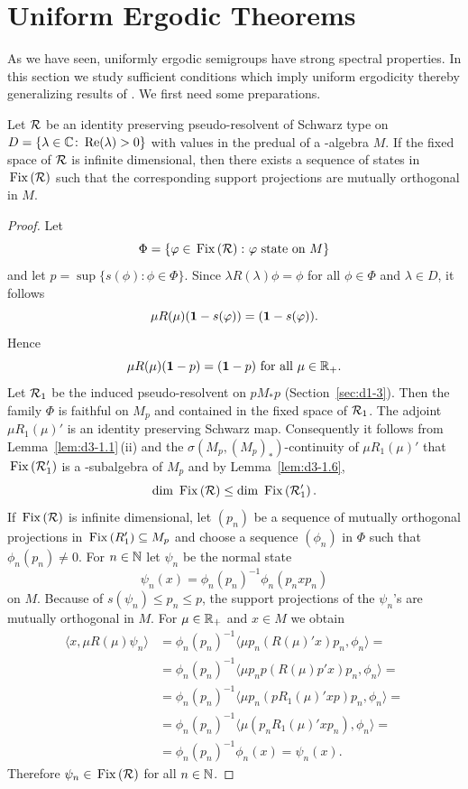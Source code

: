 \section{Uniform Ergodic Theorems}\label{sec:d4-4}
As we have seen, uniformly ergodic semigroups have strong spectral properties.
In this section we study sufficient conditions which imply uniform ergodicity thereby generalizing results of 
\textcite{groh:1984b}.
We first need some preparations.
\begin{lemma}\label{lem:d4-4.1}
Let $ \mathcal{R} $  be an identity preserving pseudo-resolvent of Schwarz type on $ D = \{\lambda \in \mathbb{C} \colon  \mathop{}\!\mathrm{Re}(\lambda) > 0\} $  with values in the predual of a \WA-algebra $ M $.
If the fixed space of\/ $ \mathcal{R} $  is infinite dimensional, then there exists a sequence of states in $ \mathop{}\mathrm{Fix}\left(\mathcal{R}\right) $  such that the corresponding support projections are mutually orthogonal in $ M $.
\end{lemma}
\begin{proof}
Let 
%
\[
	\Phi = \{\phi \in \Fix{\RR} \colon \phi \text{ state on $ M $}\}  
\]
%
and let 
$ p = \sup\{s(\phi) \colon \phi \in \Phi\} $.
Since 
$ \lambda R(\lambda)\phi = \phi $  
for all $ \phi \in \Phi $  and $ \lambda \in D $,  it follows 
%
\[
	\mu R(\mu)(\1 - s(\phi)) = (\1 - s(\phi)) .
\]
%
Hence 
%
\[
	\mu R(\mu)(\mathbf{1} - p) = (\mathbf{1} -p )    \text{ for all } \mu \in \mathbb{R}_{+} .
\]
%
Let $ \mathcal{R}_{1} $  be the induced pseudo-resolvent on $ pM_{*}p $  (Section~\ref{sec:d1-3}).
Then the family $ \Phi $  is faithful on $ M_{p} $  and contained in the fixed space of\/ $ \mathcal{R}_{1} $.
The adjoint $ \mu R_{1}(\mu)' $  is an identity preserving Schwarz map.
Consequently it follows from Lemma~\ref{lem:d3-1.1}\,(ii) and the $ \sigma(M_{p},(M_{p})_{*}) $-continuity of\/ $ \mu R_{1}(\mu)' $  that $ \mathop{}\mathrm{Fix}\left(\mathcal{R}_{1}'\right) $  is a \WA-subalgebra of\/ $ M_{p} $  and 
by Lemma~\ref{lem:d3-1.6}, 
%
\[
	\dim \Fix{\RR} \leq \dim \Fix{\RR_{1}'} .
\]
%
If\/ $ \mathop{}\mathrm{Fix}\left(\mathcal{R}\right) $  is infinite dimensional, let $ (p_{n}) $  be a sequence of mutually orthogonal projections in 
$ \mathop{}\mathrm{Fix}\left( R_{1}' \right) \subseteq M_{p} $  and choose a sequence $ (\phi_{n}) $  in $ \Phi $  such that $ \phi_{n}(p_{n}) \neq 0 $.
For $ n \in \mathbb{N} $  let $ \psi_{n} $  be the normal state
\[
\psi_{n}(x) = \phi_{n}(p_{n})^{-1}\phi_{n}(p_{n}xp_{n})
\]
on $ M $.
Because of\/ $ s(\psi_{n}) \leq p_{n} \leq p $, the support projections of the $ \psi_{n} $'s are mutually orthogonal in $ M $.
For $ \mu \in \mathbb{R}_{+} $  and $ x \in M $  we obtain
\[
\begin{aligned}
\langle x,\mu R(\mu)\psi_{n}\rangle &= \phi_{n}(p_{n})^{-1}\langle\mu p_{n}(R(\mu)'x)p_{n},\phi_{n}\rangle = \\
&= \phi_{n}(p_{n})^{-1}\langle\mu p_{n}p(R(\mu)p'x)p_{n},\phi_{n}\rangle = \\
&= \phi_{n}(p_{n})^{-1}\langle\mu p_{n}(pR_{1}(\mu)'xp)p_{n},\phi_{n}\rangle = \\
&= \phi_{n}(p_{n})^{-1}\langle\mu(p_{n}R_{1}(\mu)'xp_{n}),\phi_{n}\rangle = \\
&= \phi_{n}(p_{n})^{-1}\phi_{n}(x) = \psi_{n}(x).
\end{aligned}
\]
Therefore $ \psi_{n} \in \mathop{}\mathrm{Fix}\left(\mathcal{R}\right) $  for all $ n \in \mathbb{N} $.
\end{proof}
